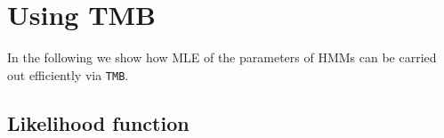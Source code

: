 \documentclass[bimj,fleqn]{w-art}\usepackage[]{graphicx}\usepackage[]{color}
\theoremstyle{plain}
\theoremstyle{definition}
\begin{document}
% 
% 
% 
% 
% 
% 
% 
% 
% 


\section{Using TMB}
\label{sec:tmb}

In the following we show how MLE of the parameters of HMMs can be carried out efficiently via {\tt{TMB}}. 

\subsection{Likelihood function}
\label{sec:tmb_cpp}
\end{document}
